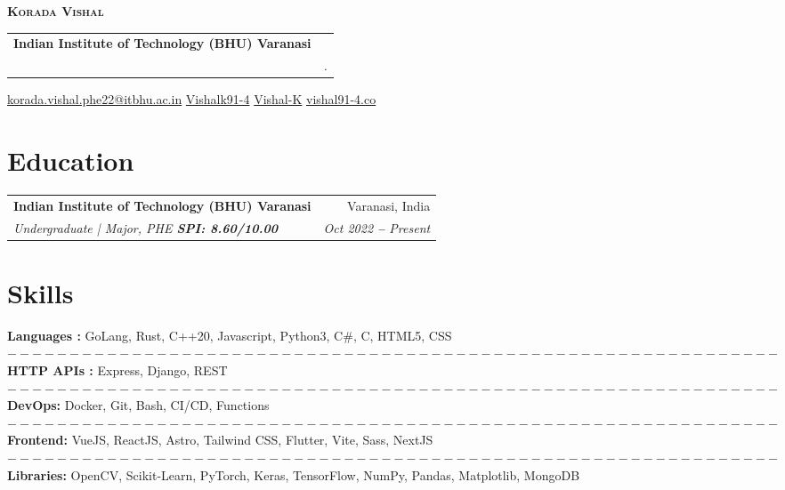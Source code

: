 \documentclass[letterpaper,11pt]{article}
\makeatletter
\newcommand{\resumeSubheading}[4]{
  \vspace{-2pt}\item
    \begin{tabular*}{0.97\textwidth}[t]{l@{\extracolsep{\fill}}r}
      \textbf{#1} & #2 \\
      \textit{\small#3} & \textit{\small #4} \\
    \end{tabular*}\vspace{-7pt}
}
\newcommand{\resumeSubHeadingListStart}{\begin{itemize}[leftmargin=0.15in, label={}]}
\newcommand{\resumeSubHeadingListEnd}{\end{itemize}}
\makeatother
\begin{document}

\begin{left}

    \textbf{\Huge \scshape Korada Vishal} \\ \vspace{3pt}
    \resumeSubheading {
    \color{blue}
    \Large
    {Indian Institute of Technology (BHU) Varanasi}
    }
    \small
    \hspace{.}
    
    { \color{blue} \faAt} \hspace{.5pt} \href{mailto:korada.vishal.phe22@itbhu.ac.in}{korada.vishal.phe22@itbhu.ac.in}
    \hspace{.5pt}
    { \color{blue} \faGithub} \hspace{.1pt} \href{https://github.com/Vishalk91-4}{Vishalk91-4}
    \hspace{.5pt}
    { \color{blue} \faLinkedin} \hspace{.1pt} \href{https://www.linkedin.com/in/vishal-k-2865b6254}{Vishal-K}
    \hspace{.5pt}
    { \color{blue} \faGlobe} \hspace{.1pt} \href{https://vishal91-4.co}{vishal91-4.co}



\section{ \color{blue} \Large Education}
  \resumeSubHeadingListStart
    {
    \resumeSubheading
      {Indian Institute of Technology (BHU) Varanasi 
      }{Varanasi, India}
          {Undergraduate | Major, PHE   \textbf{ SPI: 8.60/10.00}}{Oct 2022 \textbf{--} Present}    
}
  \resumeSubHeadingListEnd



\section{ \color{blue} \Large Skills}
  \vspace{2pt}
  \resumeSubHeadingListStart
    \small{\item{
        \textbf{Languages :}{ GoLang, Rust, C++20, Javascript, Python3, C#, C, HTML5, CSS} 
        $--------------------------------------------------------------$
        \textbf{HTTP APIs :}{ Express, Django, REST } 
        $--------------------------------------------------------------$
        \textbf{DevOps:}{ Docker, Git, Bash, CI/CD, Functions } 
        $--------------------------------------------------------------$
        \textbf{Frontend:}{ VueJS, ReactJS, Astro, Tailwind CSS, Flutter, Vite, Sass, NextJS}
        $--------------------------------------------------------------$
        \textbf{Libraries:}{ OpenCV, Scikit-Learn, PyTorch, Keras, TensorFlow, NumPy, Pandas, Matplotlib, MongoDB} \\ \vspace{3pt}
    }}
  \resumeSubHeadingListEnd


\end{left}
\end{document}
